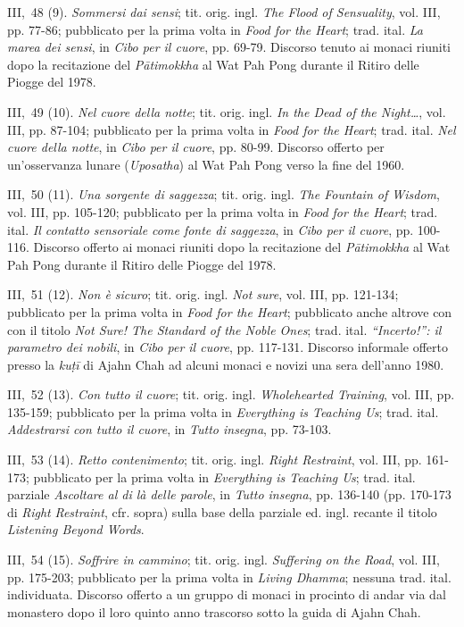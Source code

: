 III,~48 (9). \emph{Sommersi dai sensi}; tit. orig. ingl. \emph{The Flood
of Sensuality}, vol. III, pp. 77-86; pubblicato per la prima volta in
\emph{Food for the Heart}; trad. ital. \emph{La marea dei sensi}, in
\emph{Cibo per il cuore}, pp. 69-79. Discorso tenuto ai monaci riuniti
dopo la recitazione del \emph{Pātimokkha} al Wat Pah Pong durante il
Ritiro delle Piogge del 1978.

III,~49 (10). \emph{Nel cuore della notte}; tit. orig. ingl. \emph{In
the Dead of the Night\ldots{}}, vol. III, pp. 87-104; pubblicato per la prima
volta in \emph{Food for the Heart}; trad. ital. \emph{Nel cuore della
notte}, in \emph{Cibo per il cuore}, pp. 80-99. Discorso offerto per
un'osservanza lunare (\emph{Uposatha}) al Wat Pah Pong verso la fine del
1960.

III,~50 (11). \emph{Una sorgente di saggezza}; tit. orig. ingl.
\emph{The Fountain of Wisdom}, vol. III, pp. 105-120; pubblicato per la
prima volta in \emph{Food for the Heart}; trad. ital. \emph{Il contatto
sensoriale come fonte di saggezza}, in \emph{Cibo per il cuore}, pp.
100-116. Discorso offerto ai monaci riuniti dopo la recitazione del
\emph{Pātimokkha} al Wat Pah Pong durante il Ritiro delle Piogge del
1978.

III,~51 (12). \emph{Non è sicuro}; tit. orig. ingl. \emph{Not sure},
vol. III, pp. 121-134; pubblicato per la prima volta in \emph{Food for
the Heart}; pubblicato anche altrove con con il titolo \emph{Not Sure!
The Standard of the Noble Ones}; trad. ital. \emph{``Incerto!'': il
parametro dei nobili}, in \emph{Cibo per il cuore}, pp. 117-131.
Discorso informale offerto presso la \emph{kuṭī} di Ajahn Chah ad alcuni
monaci e novizi una sera dell'anno 1980.

III,~52 (13). \emph{Con tutto il cuore}; tit. orig. ingl.
\emph{Wholehearted Training}, vol. III, pp. 135-159; pubblicato per la
prima volta in \emph{Everything is Teaching Us}; trad. ital.
\emph{Addestrarsi con tutto il cuore}, in \emph{Tutto insegna}, pp.
73-103.

III,~53 (14). \emph{Retto contenimento}; tit. orig. ingl. \emph{Right
Restraint}, vol. III, pp. 161-173; pubblicato per la prima volta in
\emph{Everything is Teaching Us}; trad. ital. parziale \emph{Ascoltare
al di là delle parole}, in \emph{Tutto insegna}, pp. 136-140 (pp.
170-173 di \emph{Right} \emph{Restraint}, cfr. sopra) sulla base della
parziale ed. ingl. recante il titolo \emph{Listening Beyond Words}.

III,~54 (15). \emph{Soffrire in cammino}; tit. orig. ingl.
\emph{Suffering on the Road}, vol. III, pp. 175-203; pubblicato per la
prima volta in \emph{Living Dhamma}; nessuna trad. ital. individuata.
Discorso offerto a un gruppo di monaci in procinto di andar via dal
monastero dopo il loro quinto anno trascorso sotto la guida di Ajahn
Chah.

